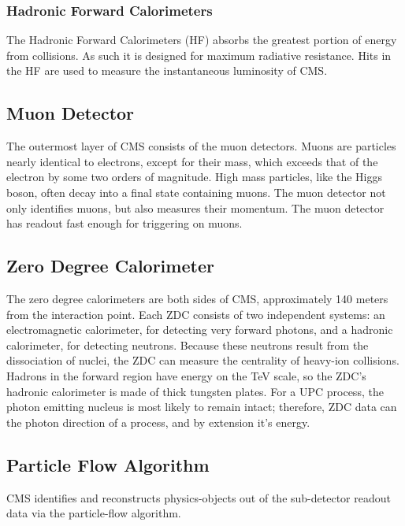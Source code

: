 \subsubsection{Hadronic Forward Calorimeters}

The Hadronic Forward Calorimeters (HF) absorbs the greatest portion of energy from collisions. As such it is designed for maximum radiative resistance. Hits in the HF are used to measure the instantaneous luminosity of CMS.

\subsection{Muon Detector}

The outermost layer of CMS consists of the muon detectors. Muons are particles nearly identical to electrons, except for their mass, which exceeds that of the electron by some two orders of magnitude. High mass particles, like the Higgs boson, often decay into a final state containing muons. The muon detector not only identifies muons, but also measures their momentum. The muon detector has readout fast enough for triggering on muons.

\subsection{Zero Degree Calorimeter}

The zero degree calorimeters are both sides of CMS, approximately 140 meters from the interaction point. Each ZDC consists of two independent systems: an electromagnetic calorimeter, for detecting very forward photons, and a hadronic calorimeter, for detecting neutrons. Because these neutrons result from the dissociation of nuclei, the ZDC can measure the centrality of heavy-ion collisions. Hadrons in the forward region have energy on the TeV scale, so the ZDC's hadronic calorimeter is made of thick tungsten plates. For a UPC process, the photon emitting nucleus is most likely to remain intact; therefore, ZDC data can the photon direction of a process, and by extension it's energy. 

\subsection{Particle Flow Algorithm}

CMS identifies and reconstructs physics-objects out of the sub-detector readout data via the particle-flow algorithm. 

